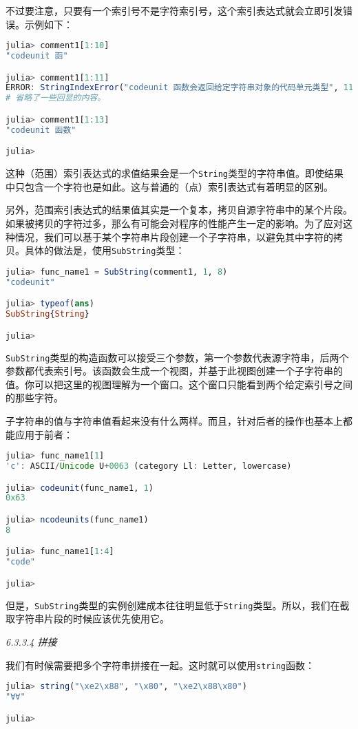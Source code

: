 不过要注意，只要有一个索引号不是字符索引号，这个索引表达式就会立即引发错误。示例如下：
\begin{lstlisting}[language=julia]
julia> comment1[1:10]
"codeunit 函"

julia> comment1[1:11]
ERROR: StringIndexError("codeunit 函数会返回给定字符串对象的代码单元类型", 11)
# 省略了一些回显的内容。

julia> comment1[1:13]
"codeunit 函数"

julia> 
\end{lstlisting}

这种（范围）索引表达式的求值结果会是一个\verb`String`类型的字符串值。即使结果中只包含一个字符也是如此。这与普通的（点）索引表达式有着明显的区别。

另外，范围索引表达式的结果值其实是一个复本，拷贝自源字符串中的某个片段。如果被拷贝的字符过多，那么有可能会对程序的性能产生一定的影响。为了应对这种情况，我们可以基于某个字符串片段创建一个子字符串，以避免其中字符的拷贝。具体的做法是，使用\verb`SubString`类型：
\begin{lstlisting}[language=julia]
julia> func_name1 = SubString(comment1, 1, 8)
"codeunit"

julia> typeof(ans)
SubString{String}

julia> 
\end{lstlisting}

\verb`SubString`类型的构造函数可以接受三个参数，第一个参数代表源字符串，后两个参数都代表索引号。该函数会生成一个视图，并基于此视图创建一个子字符串的值。你可以把这里的视图理解为一个窗口。这个窗口只能看到两个给定索引号之间的那些字符。

子字符串的值与字符串值看起来没有什么两样。而且，针对后者的操作也基本上都能应用于前者：
\begin{lstlisting}[language=julia]
julia> func_name1[1]
'c': ASCII/Unicode U+0063 (category Ll: Letter, lowercase)

julia> codeunit(func_name1, 1)
0x63

julia> ncodeunits(func_name1)
8

julia> func_name1[1:4]
"code"

julia> 
\end{lstlisting}

但是，\verb`SubString`类型的实例创建成本往往明显低于\verb`String`类型。所以，我们在截取字符串片段的时候应该优先使用它。

\textsl{6.3.3.4 拼接}

我们有时候需要把多个字符串拼接在一起。这时就可以使用\verb`string`函数：
\begin{lstlisting}[language=julia]
julia> string("\xe2\x88", "\x80", "\xe2\x88\x80")
"∀∀"

julia> 
\end{lstlisting}


